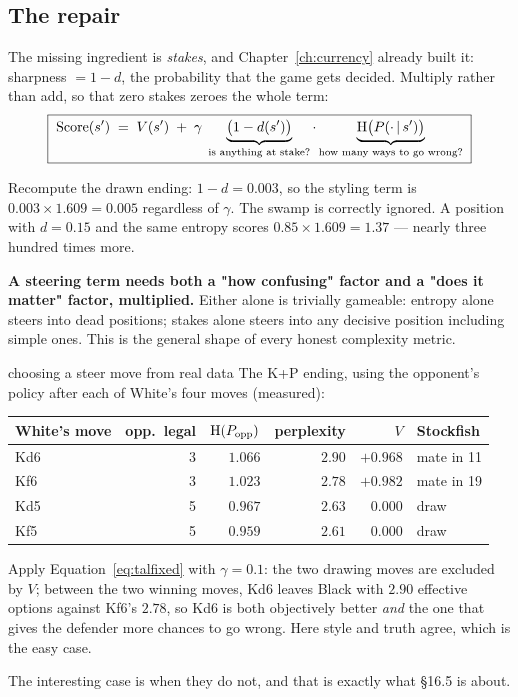 \subsection{The repair}

The missing ingredient is \emph{stakes}, and Chapter~\ref{ch:currency} already built it:
sharpness $= 1 - d$, the probability that the game gets decided. Multiply rather than add,
so that zero stakes zeroes the whole term:
\begin{equation}
  \label{eq:talfixed}
  \boxed{\;
  \text{Score}(s') \;=\; V(s') \;+\; \gamma\;\underbrace{\bigl(1 - d(s')\bigr)}_{\text{is anything at stake?}}
  \cdot\underbrace{\operatorname{H}\bigl(P(\cdot\,|\, s')\bigr)}_{\text{how many ways to go wrong?}} \;}
\end{equation}

Recompute the drawn ending: $1 - d = 0.003$, so the styling term is
$0.003 \times 1.609 = 0.005$ regardless of $\gamma$. The swamp is correctly ignored. A
position with $d = 0.15$ and the same entropy scores $0.85 \times 1.609 = 1.37$ --- nearly
three hundred times more.

\begin{keyidea}
\textbf{A steering term needs both a "how confusing" factor and a "does it matter" factor,
multiplied.} Either alone is trivially gameable: entropy alone steers into dead positions;
stakes alone steers into any decisive position including simple ones. This is the general
shape of every honest complexity metric.
\end{keyidea}

\begin{worked}{choosing a steer move from real data}
The K+P ending, using the opponent's policy after each of White's four moves (measured):
\begin{center}
\begin{tabular}{@{}lrrrrl@{}}
\toprule
White's move & opp.\ legal & $\operatorname{H}(P_{\text{opp}})$ & perplexity & $V$ & Stockfish \\
\midrule
Kd6 & 3 & $1.066$ & $2.90$ & $+0.968$ & mate in 11 \\
Kf6 & 3 & $1.023$ & $2.78$ & $+0.982$ & mate in 19 \\
Kd5 & 5 & $0.967$ & $2.63$ & $0.000$ & draw \\
Kf5 & 5 & $0.959$ & $2.61$ & $0.000$ & draw \\
\bottomrule
\end{tabular}
\end{center}
Apply Equation~\eqref{eq:talfixed} with $\gamma = 0.1$: the two drawing moves are excluded by
$V$; between the two winning moves, Kd6 leaves Black with $2.90$ effective options against
Kf6's $2.78$, so Kd6 is both objectively better \emph{and} the one that gives the defender
more chances to go wrong. Here style and truth agree, which is the easy case.

The interesting case is when they do not, and that is exactly what §16.5 is about.
\end{worked}

